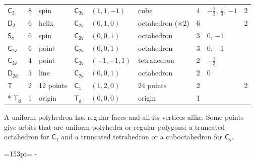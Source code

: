 \documentclass[10pt,a4paper]{article}
\newcommand{\needspace}[1]{\par\penalty-100\begingroup\dimen0=#1\relax\dimen2=\pagegoal
  \advance\dimen2-\pagetotal\ifdim\dimen0>\dimen2\relax\ifdim\dimen2>0pt\vfil\break\fi\fi
  \endgroup}
\numberwithin{equation}{section}
\newcommand{\grp}[1]{\mathsf{#1}}
\newlength{\fillwidth}\newlength{\cellwidth}\newlength{\colwidth}
\begin{document}
{{\begin{longtable}{@{}lrllllr>{\RaggedRight\arraybackslash}p{\fillwidth}r@{}}
\href{C3.pdf}{$\grp{C_{3}}$} & 8 & spin & \href{C3v.pdf}{$\grp{C_{3v}}$} & $(1, 1, -1)$ & cube & 4 & ${-\tfrac{1}{3}}$, ${\tfrac{1}{3}}$, ${-1}$ & 2\\
\href{D2.pdf}{$\grp{D_{2}}$} & 6 & helix & \href{C2v.pdf}{$\grp{C_{2v}}$} & $(0, 1, 0)$ & octahedron (${\times}2$) & 6 &  & 2\\
\href{S4.pdf}{$\grp{S_{4}}$} & 6 & spin & \href{C2v.pdf}{$\grp{C_{2v}}$} & $(0, 0, 1)$ & octahedron & 3 & ${0}$, ${-1}$ & \\
\href{C2v.pdf}{$\grp{C_{2v}}$} & 6 & point & \href{C2v.pdf}{$\grp{C_{2v}}$} & $(0, 0, 1)$ & octahedron & 3 & ${0}$, ${-1}$ & \\
\href{C3v.pdf}{$\grp{C_{3v}}$} & 4 & point & \href{C3v.pdf}{$\grp{C_{3v}}$} & $(-1, -1, 1)$ & tetrahedron & 2 & ${-\tfrac{1}{3}}$ & \\
\href{D2d.pdf}{$\grp{D_{2d}}$} & 3 & line & \href{C2v.pdf}{$\grp{C_{2v}}$} & $(0, 0, 1)$ & octahedron & 2 & ${0}$ & \\
\href{T.pdf}{$\grp{T}$} & 2 & 12 points & \href{C1.pdf}{$\grp{C_{1}}$} & $(1, 2, 0)$ & 24 points & 2 &  & 2\\*
\href{Td.pdf}{$\grp{T_{d}}$} & 1 & origin & \href{Td.pdf}{$\grp{T_{d}}$} & $(0, 0, 0)$ & origin & 1 &  & \\
\bottomrule\end{longtable}}}
A uniform polyhedron has regular faces and all its vertices alike. Some points give orbits that are uniform polyhedra or regular polygons: a truncated octahedron for \href{C1.pdf}{$\grp{C_{1}}$} and a truncated tetrahedron or a cuboctahedron for \href{C1v.pdf}{$\grp{C_{s}}$}.
\needspace{153pt}
\end{document}

